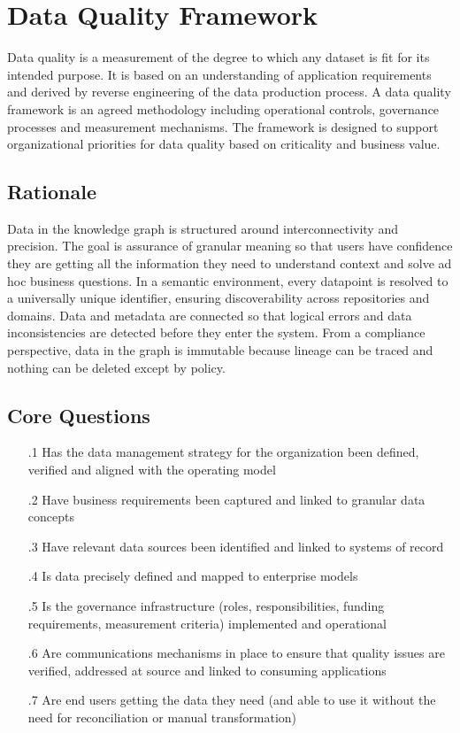 \section{Data Quality Framework}\label{sec:b-3-1} %

Data quality is a measurement of the degree to which any dataset is fit for its intended purpose.
It is based on an understanding of application requirements and derived by reverse engineering of the data production process.
A data quality framework is an agreed methodology including operational controls, governance processes and measurement mechanisms.
The framework is designed to support organizational priorities for data quality based on criticality and business value.

\subsection*{ Rationale}

Data in the knowledge graph is structured around interconnectivity and precision.
The goal is assurance of granular meaning so that users have confidence they are getting all the information they need to understand context and solve ad hoc business questions.
In a semantic environment, every datapoint is resolved to a universally unique identifier, ensuring discoverability across repositories and domains.
Data and metadata are connected so that logical errors and data inconsistencies are detected before they enter the system.
From a compliance perspective, data in the graph is immutable because lineage can be traced and nothing can be deleted except by policy.

\subsection*{Core Questions}

\begin{itemize}[leftmargin=.5in]
  \item [\thesection.1] Has the data management strategy for the organization been defined, verified and aligned with the operating model
  \item [\thesection.2] Have business requirements been captured and linked to granular data concepts
  \item [\thesection.3] Have relevant data sources been identified and linked to systems of record
  \item [\thesection.4] Is data precisely defined and mapped to enterprise models
  \item [\thesection.5] Is the governance infrastructure (roles, responsibilities, funding requirements, measurement criteria) implemented and operational
  \item [\thesection.6] Are communications mechanisms in place to ensure that quality issues are verified, addressed at source and linked to consuming applications
  \item [\thesection.7] Are end users getting the data they need (and able to use it without the need for reconciliation or manual transformation)
\end{itemize}

